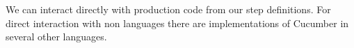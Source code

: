     We can interact directly with 
    production code from our \CUKE{} step definitions. For direct interaction with non 
    languages there are implementations of Cucumber in several other languages.
\fi